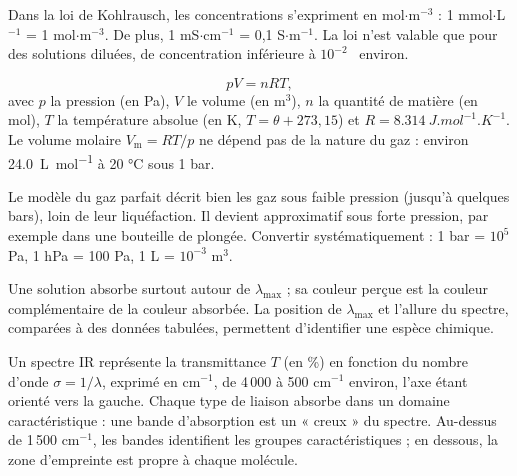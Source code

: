 \begin{attention}
Dans la loi de Kohlrausch, les concentrations s'expriment en mol$\cdot$m$^{-3}$ : 1 mmol$\cdot$L$^{-1}$ = 1 mol$\cdot$m$^{-3}$.
De plus, 1 mS$\cdot$cm$^{-1}$ = 0,1 S$\cdot$m$^{-1}$. La loi n'est valable que pour des solutions diluées,
de concentration inférieure à $10^{-2}$ \molL\ environ.
\end{attention}
\begin{loi}
\[pV=nRT,\]
avec $p$ la pression (en Pa), $V$ le volume (en m$^3$), $n$ la quantité de matière (en mol),
$T$ la température absolue (en K, $T=\theta+273{,}15$) et $R=\qty{8,314}{J.mol^{-1}.K^{-1}}$.
Le volume molaire $V_\mathrm{m}=RT/p$ ne dépend pas de la nature du gaz : environ \qty{24,0}{L.mol^{-1}} à 20 °C sous 1 bar.
\end{loi}
\begin{attention}
Le modèle du gaz parfait décrit bien les gaz sous faible pression (jusqu'à quelques bars), loin de leur
liquéfaction. Il devient approximatif sous forte pression, par exemple dans une bouteille de plongée.
Convertir systématiquement : 1 bar = $10^5$ Pa, 1 hPa = 100 Pa, 1 L = $10^{-3}$ m$^3$.
\end{attention}
\begin{propriete}
Une solution absorbe surtout autour de $\lambda_{\max}$ ; sa couleur perçue est la couleur complémentaire de la
couleur absorbée. La position de $\lambda_{\max}$ et l'allure du spectre, comparées à des données tabulées,
permettent d'identifier une espèce chimique.
\end{propriete}
\begin{definition}
Un spectre IR représente la transmittance $T$ (en \%) en fonction du nombre d'onde $\sigma=1/\lambda$, exprimé en
cm$^{-1}$, de 4\,000 à 500 cm$^{-1}$ environ, l'axe étant orienté vers la gauche. Chaque type de liaison absorbe
dans un domaine caractéristique : une bande d'absorption est un « creux » du spectre. Au-dessus de 1\,500 cm$^{-1}$,
les bandes identifient les groupes caractéristiques ; en dessous, la zone d'empreinte est propre à chaque molécule.
\end{definition}
